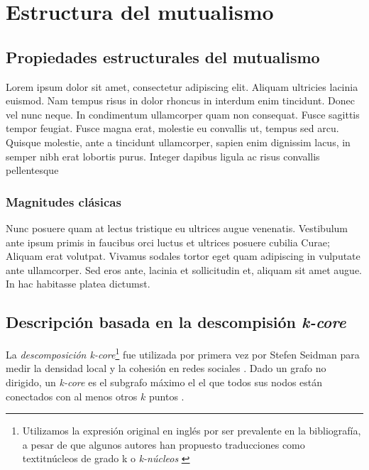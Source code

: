 
\chapter{Estructura del mutualismo} %
\label{ESTATICA} %


\section{Propiedades estructurales del mutualismo}

Lorem ipsum dolor sit amet, consectetur adipiscing elit. Aliquam ultricies lacinia euismod. Nam tempus risus in dolor rhoncus in interdum enim tincidunt. Donec vel nunc neque. In condimentum ullamcorper quam non consequat. Fusce sagittis tempor feugiat. Fusce magna erat, molestie eu convallis ut, tempus sed arcu. Quisque molestie, ante a tincidunt ullamcorper, sapien enim dignissim lacus, in semper nibh erat lobortis purus. Integer dapibus ligula ac risus convallis pellentesque 

\subsection{Magnitudes clásicas}

Nunc posuere quam at lectus tristique eu ultrices augue venenatis. Vestibulum ante ipsum primis in faucibus orci luctus et ultrices posuere cubilia Curae; Aliquam erat volutpat. Vivamus sodales tortor eget quam adipiscing in vulputate ante ullamcorper. Sed eros ante, lacinia et sollicitudin et, aliquam sit amet augue. In hac habitasse platea dictumst.

\section{Descripción basada en la descompisión \textit{k-core}}

La \textit{descomposición k-core}\footnote{Utilizamos la expresión original en inglés por ser prevalente en la bibliografía, a pesar de que algunos autores han propuesto traducciones como textit{núcleos de grado k} \cite{herrero2000terminologia} o \textit{k-núcleos} \cite{cardona2006taxonomia, martinez2011aplicacion}} fue utilizada por primera vez por Stefen Seidman para medir la densidad local y la cohesión en redes sociales \cite{seidman1983network}. Dado un grafo no dirigido, un \textit{k-core} es el subgrafo máximo el el que todos sus nodos están conectados con al menos otros $k$ puntos \cite{dorogovtsev2006k}.

